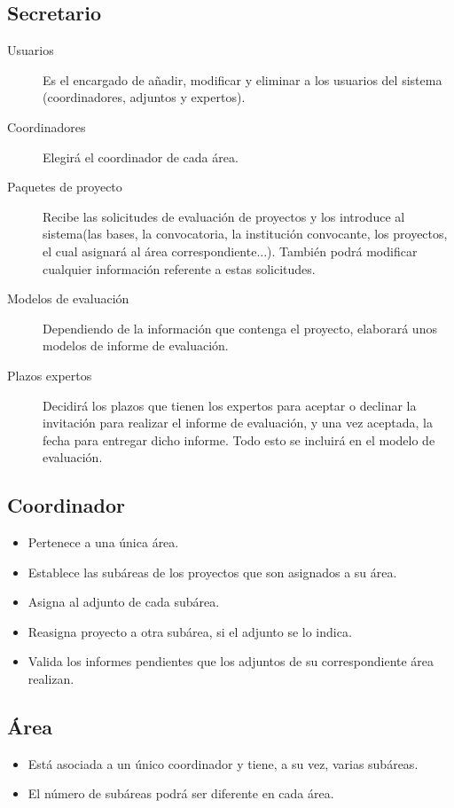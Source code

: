 \documentclass[12pt,a4paper,spanish,twoside]{book}
\begin{document}
\subsection{Secretario}
\begin{description}
\item[Usuarios] Es el encargado de añadir, modificar y eliminar a los
  usuarios del sistema (coordinadores, adjuntos y expertos).
\item[Coordinadores] Elegirá el coordinador de cada área.
\item[Paquetes de proyecto] Recibe las solicitudes de evaluación de proyectos
  y los introduce al sistema(las bases, la convocatoria, la institución
  convocante, los proyectos, el cual asignará al área correspondiente...). 
  También podrá modificar cualquier información referente a estas
  solicitudes. 
\item[Modelos de evaluación] Dependiendo de la información que contenga el
  proyecto, elaborará unos modelos de informe de evaluación. 
\item[Plazos expertos] Decidirá los plazos que tienen los expertos para
  aceptar o declinar la invitación para realizar el informe de evaluación,
  y una vez aceptada, la fecha para entregar dicho informe. Todo esto
  se incluirá en el modelo de evaluación.
\end{description}

\subsection{Coordinador}
\begin{itemize}
\item Pertenece a una única área.
\item Establece las subáreas de los proyectos que son asignados a su área.
\item Asigna al adjunto de cada subárea.
\item Reasigna proyecto a otra subárea, si el adjunto se lo indica.
\item Valida los informes pendientes que los adjuntos de su correspondiente 
  área realizan.
\end{itemize}

\subsection{Área}
\begin{itemize}
\item Está asociada a un único coordinador y tiene, a su vez, varias subáreas. 
\item El número de subáreas podrá ser diferente en cada área.
\end{itemize}
\end{document}

